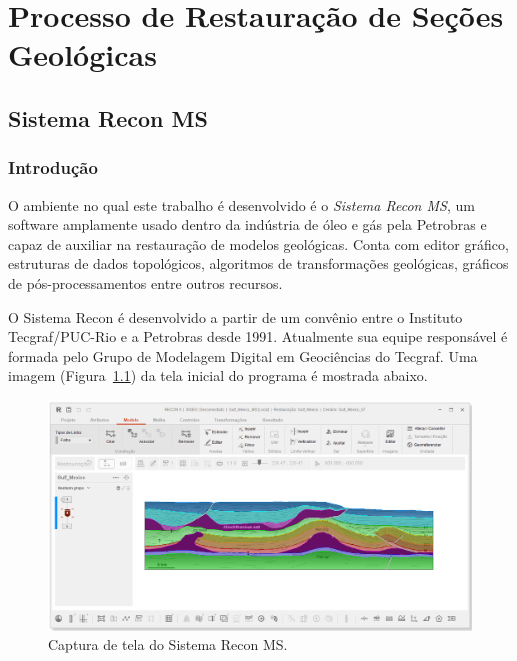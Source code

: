 
\chapter{Processo de Restauração de Seções Geológicas}

\section{Sistema Recon MS}

\subsection{Introdução}

O ambiente no qual este trabalho é desenvolvido é o \textit{Sistema Recon MS}, um software amplamente usado dentro da indústria de óleo e gás pela Petrobras e capaz de auxiliar na restauração de modelos geológicas.\cite{ReconTecgraf} Conta com editor gráfico, estruturas de dados topológicos, algoritmos de transformações geológicas, gráficos de pós-processamentos entre outros recursos.

O Sistema Recon é desenvolvido a partir de um convênio entre o Instituto Tecgraf/PUC-Rio e a Petrobras desde 1991. Atualmente sua equipe responsável é formada pelo Grupo de Modelagem Digital em Geociências do Tecgraf. Uma imagem (Figura~\ref{fig-recon}) da tela inicial do programa é mostrada abaixo.

\begin{figure} [H]
  \begin{center}
    \includegraphics[width=\textwidth]{images/fig-recon}
    \caption{Captura de tela do Sistema Recon MS\cite{Recon}.}\label{fig-recon}
  \end{center}
\end{figure}

